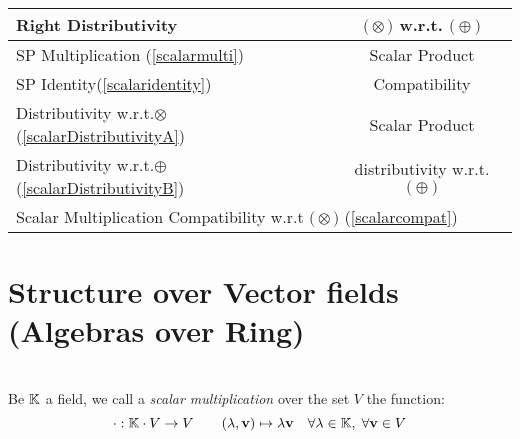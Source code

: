 \documentclass[a4paper,12pt]{scrartcl}    %
\newcommand{\OpA}{\otimes}
\newcommand{\OpB}{\oplus}
\begin{document}
\begin{landscape}
\begin{minipage}[t][]{0.60 \linewidth}
\begin{minipage}[c]{0,5\textwidth}
\begin{tabular}{|l|c|}
			    \cellcolor{blue!25} \footnotesize Right Distributivity & \tiny\cellcolor{yellow!25} $\big(\OpA\big)$ w.r.t. $\big(\OpB\big)$  \\
			   \hline
			  \hline
			     \cellcolor{blue!25} \footnotesize SP Multiplication (\ref{scalarmulti})&  \tiny\cellcolor{yellow!25}Scalar Product\\
			    \cellcolor{blue!25} \footnotesize SP Identity(\ref{scalaridentity}) & \tiny\cellcolor{yellow!25} Compatibility  \\
			   \hline 
			    \cellcolor{blue!25} \footnotesize Distributivity w.r.t.$\OpA$ (\ref{scalarDistributivityA})&  \tiny\cellcolor{yellow!25}Scalar Product\\
			    \cellcolor{blue!25} \footnotesize Distributivity w.r.t.$\OpB$ (\ref{scalarDistributivityB}) & \tiny\cellcolor{yellow!25} distributivity w.r.t. $\big(\OpB\big)$  \\
			   \hline
			    \multicolumn{2}{l}{\footnotesize \cellcolor{blue!25} Scalar Multiplication Compatibility w.r.t  $\big(\OpA\big)$ (\ref{scalarcompat})}\\
			   \hline
			\end{tabular}
			\vfill
		\end{minipage}
	\end{minipage}	


\newpage
	\begin{minipage}[c][\textheight]{0.30 \linewidth}
	    \section*{Structure over Vector fields (Algebras over Ring)}
	    \mbox{}\\
			Be $\mathbb{K}$ a field, we call a \emph{scalar multiplication} over the set $V$ the function:
				\begin{displaymath}
					\cdot : \mathbb{K} \cdot V \rightarrow  V \qquad (\lambda, \mathbf{v}) \mapsto \lambda \mathbf{v} \quad \forall \lambda \in \mathbb{K},\; 
					\forall \mathbf{v} \in V
				\end{displaymath}
			

\end{minipage}
\end{landscape}
\end{document}
